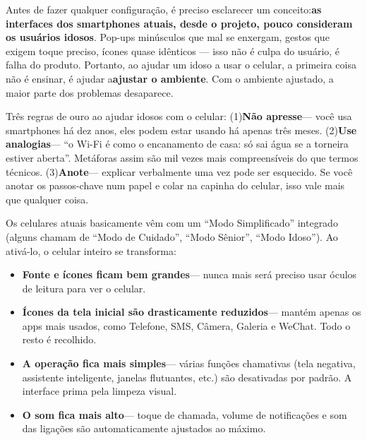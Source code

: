 


Antes de fazer qualquer configuração, é preciso esclarecer um conceito:\textbf{as interfaces dos smartphones atuais, desde o projeto, pouco consideram os usuários idosos}. Pop-ups minúsculos que mal se enxergam, gestos que exigem toque preciso, ícones quase idênticos — isso não é culpa do usuário, é falha do produto. Portanto, ao ajudar um idoso a usar o celular, a primeira coisa não é ensinar, é ajudar a\textbf{ajustar o ambiente}. Com o ambiente ajustado, a maior parte dos problemas desaparece.

Três regras de ouro ao ajudar idosos com o celular: (1)\textbf{Não apresse}— você usa smartphones há dez anos, eles podem estar usando há apenas três meses. (2)\textbf{Use analogias}— “o Wi-Fi é como o encanamento de casa: só sai água se a torneira estiver aberta”. Metáforas assim são mil vezes mais compreensíveis do que termos técnicos. (3)\textbf{Anote}— explicar verbalmente uma vez pode ser esquecido. Se você anotar os passos-chave num papel e colar na capinha do celular, isso vale mais que qualquer coisa.


Os celulares atuais basicamente vêm com um “Modo Simplificado” integrado (alguns chamam de “Modo de Cuidado”, “Modo Sênior”, “Modo Idoso”). Ao ativá-lo, o celular inteiro se transforma:

\begin{itemize}
  \item \textbf{Fonte e ícones ficam bem grandes}— nunca mais será preciso usar óculos de leitura para ver o celular.
  \item \textbf{Ícones da tela inicial são drasticamente reduzidos}— mantém apenas os apps mais usados, como Telefone, SMS, Câmera, Galeria e WeChat. Todo o resto é recolhido.
  \item \textbf{A operação fica mais simples}— várias funções chamativas (tela negativa, assistente inteligente, janelas flutuantes, etc.) são desativadas por padrão. A interface prima pela limpeza visual.
  \item \textbf{O som fica mais alto}— toque de chamada, volume de notificações e som das ligações são automaticamente ajustados ao máximo.
\end{itemize}

